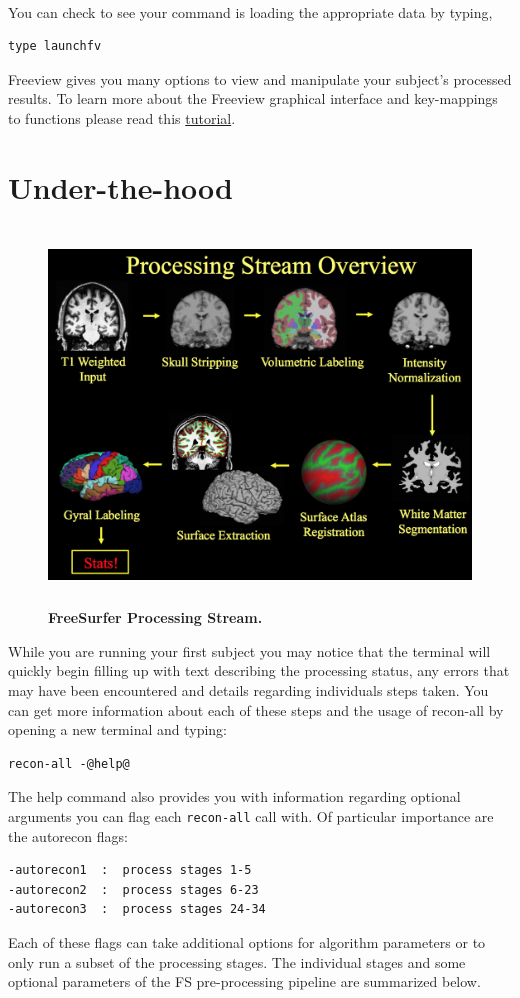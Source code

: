 \documentclass[paper=a4, fontsize=11pt]{scrartcl} %
\numberwithin{equation}{section} %
\numberwithin{figure}{section} %
\numberwithin{table}{section} %
\begin{document}
~\\You can check to see your command is loading the appropriate data by typing,
\begin{lstlisting}
type launchfv
\end{lstlisting}

Freeview gives you many options to view and manipulate your subject's processed results. To learn more about the Freeview graphical interface and key-mappings to functions please read this \href{https://surfer.nmr.mgh.harvard.edu/fswiki/FsTutorial/OutputData_freeview}{tutorial}.
\section{Under-the-hood}
\begin{figure}[h]
\includegraphics[width=13cm,height=10cm]{FSprocstream}
\caption{\textbf{FreeSurfer Processing Stream.}}
\end{figure}
While you are running your first subject you may notice that the terminal will quickly begin filling up with text describing the processing status, any errors that may have been encountered and details regarding individuals steps taken.  You can get more information about each of these steps and the usage of recon-all by opening a new terminal and typing:
\begin{lstlisting}[frame=single]
recon-all -@help@
\end{lstlisting}
The help command also provides you with information regarding optional arguments you can flag each \texttt{recon-all} call with.  Of particular importance are the autorecon flags:\newpage
\begin{lstlisting}
-autorecon1  :  process stages 1-5
-autorecon2  :  process stages 6-23
-autorecon3  :  process stages 24-34
\end{lstlisting}
Each of these flags can take additional options for algorithm parameters or to only run a subset of the processing stages. The individual stages and some optional parameters of the FS pre-processing pipeline are summarized below.
\end{document}
